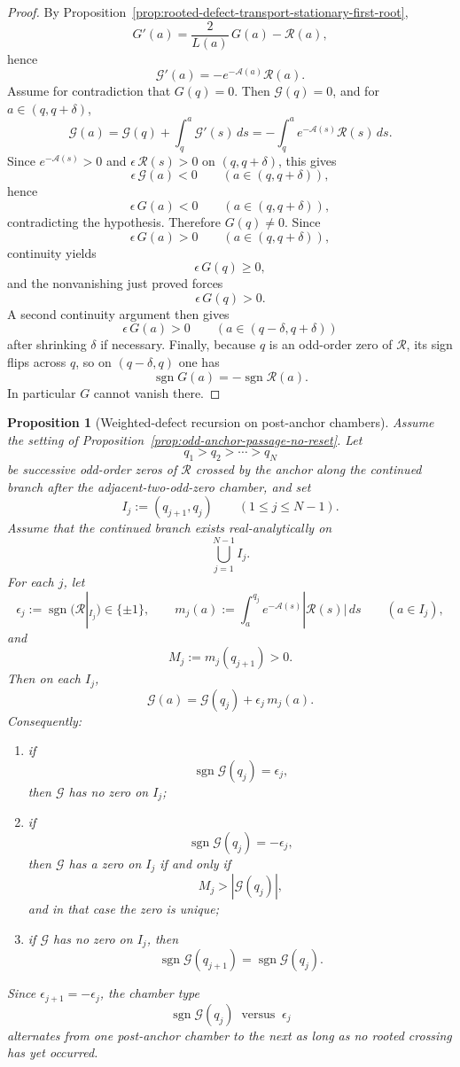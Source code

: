 \documentclass[11pt,a4paper]{amsart}
\theoremstyle{plain}
\newtheorem{proposition}[theorem]{Proposition}
\theoremstyle{definition}
\begin{document}
\begin{proof}
By
Proposition~\ref{prop:rooted-defect-transport-stationary-first-root},
\[
G'(a)=\frac{2}{L(a)}\,G(a)-\mathcal R(a),
\]
hence
\[
\mathscr G'(a)=-e^{-\mathcal A(a)}\mathcal R(a).
\]
Assume for contradiction that $G(q)=0$. Then $\mathscr G(q)=0$, and for
$a\in(q,q+\delta)$,
\[
\mathscr G(a)
=
\mathscr G(q)+\int_q^a \mathscr G'(s)\,ds
=
-\int_q^a e^{-\mathcal A(s)}\mathcal R(s)\,ds.
\]
Since $e^{-\mathcal A(s)}>0$ and $\epsilon\,\mathcal R(s)>0$ on $(q,q+\delta)$,
this gives
\[
\epsilon\,\mathscr G(a)<0
\qquad (a\in(q,q+\delta)),
\]
hence
\[
\epsilon\,G(a)<0
\qquad (a\in(q,q+\delta)),
\]
contradicting the hypothesis. Therefore $G(q)\neq 0$. Since
\[
\epsilon\,G(a)>0
\qquad (a\in(q,q+\delta)),
\]
continuity yields
\[
\epsilon\,G(q)\ge 0,
\]
and the nonvanishing just proved forces
\[
\epsilon\,G(q)>0.
\]
A second continuity argument then gives
\[
\epsilon\,G(a)>0
\qquad (a\in(q-\delta,q+\delta))
\]
after shrinking $\delta$ if necessary. Finally, because $q$ is an odd-order zero
of $\mathcal R$, its sign flips across $q$, so on $(q-\delta,q)$ one has
\[
\operatorname{sgn}G(a)=-\operatorname{sgn}\mathcal R(a).
\]
In particular $G$ cannot vanish there.
\end{proof}

\begin{proposition}[Weighted-defect recursion on post-anchor chambers]
\label{prop:weighted-defect-recursion-post-anchor-chambers}
Assume the setting of
Proposition~\ref{prop:odd-anchor-passage-no-reset}. Let
\[
q_1>q_2>\cdots>q_N
\]
be successive odd-order zeros of $\mathcal R$ crossed by the anchor along the
continued branch after the adjacent-two-odd-zero chamber, and set
\[
I_j:=(q_{j+1},q_j)
\qquad (1\le j\le N-1).
\]
Assume that the continued branch exists real-analytically on
\[
\bigcup_{j=1}^{N-1} I_j.
\]
For each $j$, let
\[
\epsilon_j:=\operatorname{sgn}(\mathcal R|_{I_j})\in\{\pm1\},
\qquad
m_j(a):=\int_a^{q_j} e^{-\mathcal A(s)}|\mathcal R(s)|\,ds
\qquad (a\in I_j),
\]
and
\[
M_j:=m_j(q_{j+1})>0.
\]
Then on each $I_j$,
\[
\mathscr G(a)=\mathscr G(q_j)+\epsilon_j\,m_j(a).
\]
Consequently:
\begin{enumerate}
\item if
\[
\operatorname{sgn}\mathscr G(q_j)=\epsilon_j,
\]
then $\mathscr G$ has no zero on $I_j$;

\item if
\[
\operatorname{sgn}\mathscr G(q_j)=-\epsilon_j,
\]
then $\mathscr G$ has a zero on $I_j$ if and only if
\[
M_j>|\mathscr G(q_j)|,
\]
and in that case the zero is unique;

\item if $\mathscr G$ has no zero on $I_j$, then
\[
\operatorname{sgn}\mathscr G(q_{j+1})
=
\operatorname{sgn}\mathscr G(q_j).
\]
\end{enumerate}
Since $\epsilon_{j+1}=-\epsilon_j$, the chamber type
\[
\operatorname{sgn}\mathscr G(q_j)\ \text{ versus }\ \epsilon_j
\]
alternates from one post-anchor chamber to the next as long as no rooted
crossing has yet occurred.
\end{proposition}
\end{document}
